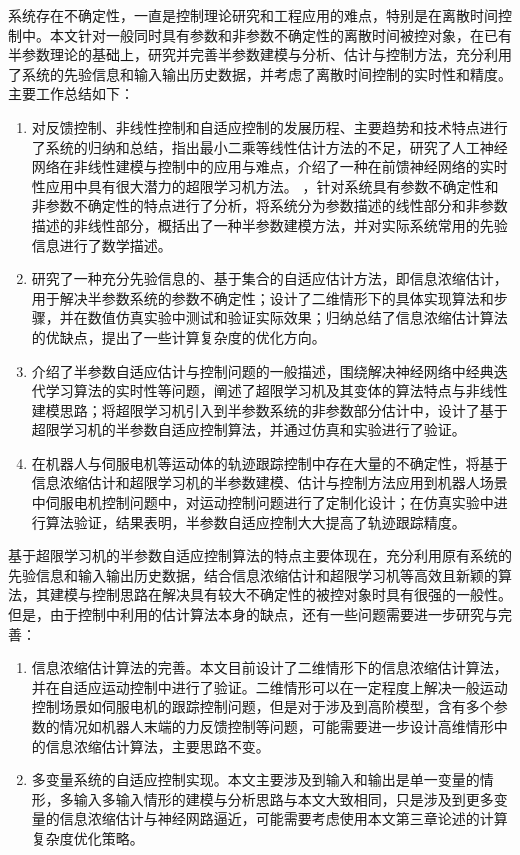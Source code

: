 
\begin{conclusion}

系统存在不确定性，一直是控制理论研究和工程应用的难点，特别是在离散时间控制中。本文针对一般同时具有参数和非参数不确定性的离散时间被控对象，在已有半参数理论的基础上，研究并完善半参数建模与分析、估计与控制方法，充分利用了系统的先验信息和输入输出历史数据，并考虑了离散时间控制的实时性和精度。主要工作总结如下：
\begin{enumerate}
\item 对反馈控制、非线性控制和自适应控制的发展历程、主要趋势和技术特点进行了系统的归纳和总结，指出最小二乘等线性估计方法的不足，研究了人工神经网络在非线性建模与控制中的应用与难点，介绍了一种在前馈神经网络的实时性应用中具有很大潜力的超限学习机方法。
，针对系统具有参数不确定性和非参数不确定性的特点进行了分析，将系统分为参数描述的线性部分和非参数描述的非线性部分，概括出了一种半参数建模方法，并对实际系统常用的先验信息进行了数学描述。
\item 研究了一种充分先验信息的、基于集合的自适应估计方法，即信息浓缩估计，用于解决半参数系统的参数不确定性；设计了二维情形下的具体实现算法和步骤，并在数值仿真实验中测试和验证实际效果；归纳总结了信息浓缩估计算法的优缺点，提出了一些计算复杂度的优化方向。
\item 介绍了半参数自适应估计与控制问题的一般描述，围绕解决神经网络中经典迭代学习算法的实时性等问题，阐述了超限学习机及其变体的算法特点与非线性建模思路；将超限学习机引入到半参数系统的非参数部分估计中，设计了基于超限学习机的半参数自适应控制算法，并通过仿真和实验进行了验证。
\item 在机器人与伺服电机等运动体的轨迹跟踪控制中存在大量的不确定性，将基于信息浓缩估计和超限学习机的半参数建模、估计与控制方法应用到机器人场景中伺服电机控制问题中，对运动控制问题进行了定制化设计；在仿真实验中进行算法验证，结果表明，半参数自适应控制大大提高了轨迹跟踪精度。
\end{enumerate}

基于超限学习机的半参数自适应控制算法的特点主要体现在，充分利用原有系统的先验信息和输入输出历史数据，结合信息浓缩估计和超限学习机等高效且新颖的算法，其建模与控制思路在解决具有较大不确定性的被控对象时具有很强的一般性。但是，由于控制中利用的估计算法本身的缺点，还有一些问题需要进一步研究与完善：
\begin{enumerate}
\item 信息浓缩估计算法的完善。本文目前设计了二维情形下的信息浓缩估计算法，并在自适应运动控制中进行了验证。二维情形可以在一定程度上解决一般运动控制场景如伺服电机的跟踪控制问题，但是对于涉及到高阶模型，含有多个参数的情况如机器人末端的力反馈控制等问题，可能需要进一步设计高维情形中的信息浓缩估计算法，主要思路不变。
\item 多变量系统的自适应控制实现。本文主要涉及到输入和输出是单一变量的情形，多输入多输入情形的建模与分析思路与本文大致相同，只是涉及到更多变量的信息浓缩估计与神经网路逼近，可能需要考虑使用本文第三章论述的计算复杂度优化策略。
\end{enumerate}
\end{conclusion}